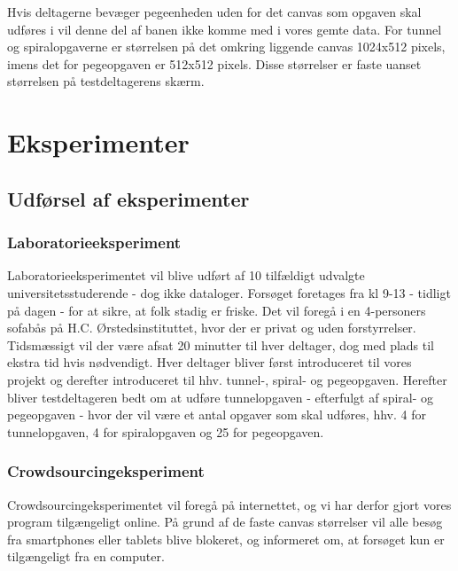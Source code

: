 Hvis deltagerne bevæger pegeenheden uden for det canvas som opgaven skal udføres i vil denne del af banen ikke komme med i vores gemte data. For tunnel og spiralopgaverne er størrelsen på det omkring liggende canvas 1024x512 pixels, imens det for pegeopgaven er 512x512 pixels. Disse størrelser er faste uanset størrelsen på testdeltagerens skærm.

\chapter*{Eksperimenter}

\section*{Udførsel af eksperimenter}

\subsection*{Laboratorieeksperiment}
Laboratorieeksperimentet vil blive udført af 10 tilfældigt udvalgte universitetsstuderende - dog ikke dataloger.
Forsøget foretages fra kl 9-13 - tidligt på dagen - for at sikre, at folk stadig er friske. Det vil foregå i en 4-personers sofabås på H.C. Ørstedsinstituttet, hvor der er privat og uden forstyrrelser.
Tidsmæssigt vil der være afsat 20 minutter til hver deltager, dog med plads til ekstra tid hvis nødvendigt.
Hver deltager bliver først introduceret til vores projekt og derefter introduceret til hhv. tunnel-, spiral- og pegeopgaven.
Herefter bliver testdeltageren bedt om at udføre tunnelopgaven - efterfulgt af spiral- og pegeopgaven - hvor der vil være et antal opgaver som skal udføres, hhv. 4 for tunnelopgaven, 4 for spiralopgaven og 25 for pegeopgaven.

\subsection*{Crowdsourcingeksperiment}
Crowdsourcingeksperimentet vil foregå på internettet, og vi har derfor gjort vores program tilgængeligt online. På grund af de faste canvas størrelser vil alle besøg fra smartphones eller tablets blive blokeret, og informeret om, at forsøget kun er tilgængeligt fra en computer. 

